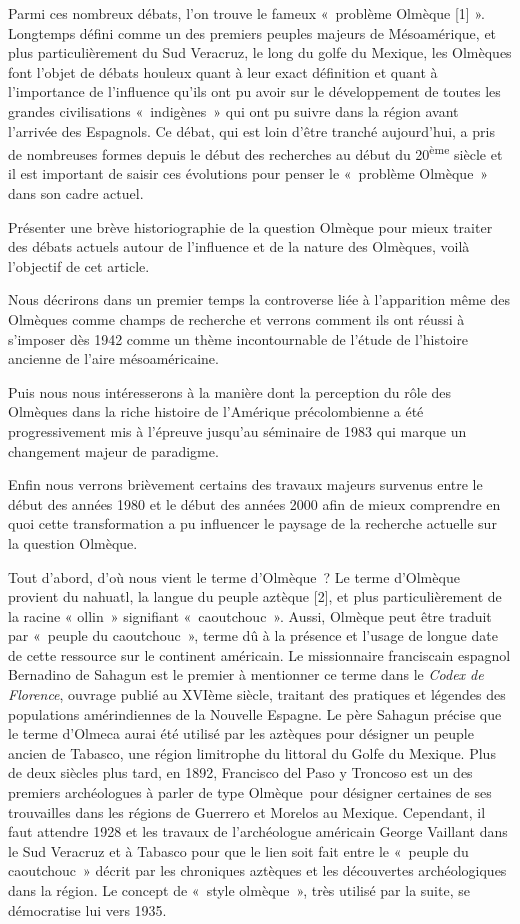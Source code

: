 \documentclass[11pt,a4paper]{article}
\begin{document}
Parmi ces nombreux débats, l'on trouve le fameux «~problème Olmèque {[}1{]} ». Longtemps défini comme un des premiers peuples majeurs de Mésoamérique, et plus particulièrement du Sud Veracruz, le long du golfe du Mexique, les Olmèques font l'objet de débats houleux quant à leur exact définition et quant à l'importance de l'influence qu'ils ont pu avoir sur le développement de toutes les grandes civilisations «~indigènes~» qui ont pu suivre dans la région avant l'arrivée des Espagnols. Ce débat, qui est loin d'être tranché aujourd'hui, a pris de nombreuses formes depuis le début des recherches au début du 20\textsuperscript{ème} siècle et il est important de saisir ces évolutions pour penser le «~problème Olmèque~» dans son cadre actuel.

Présenter une brève historiographie de la question Olmèque pour mieux traiter des débats actuels autour de l'influence et de la nature des Olmèques, voilà l'objectif de cet article.

Nous décrirons dans un premier temps la controverse liée à l'apparition même des Olmèques comme champs de recherche et verrons comment ils ont réussi à s'imposer dès 1942 comme un thème incontournable de l'étude de l'histoire ancienne de l'aire mésoaméricaine.

Puis nous nous intéresserons à la manière dont la perception du rôle des Olmèques dans la riche histoire de l'Amérique précolombienne a été progressivement mis à l'épreuve jusqu'au séminaire de 1983 qui marque un changement majeur de paradigme.

Enfin nous verrons brièvement certains des travaux majeurs survenus entre le début des années 1980 et le début des années 2000 afin de mieux comprendre en quoi cette transformation a pu influencer le paysage de la recherche actuelle sur la question Olmèque.

Tout d'abord, d'où nous vient le terme d'Olmèque~? Le terme d'Olmèque provient du nahuatl, la langue du peuple aztèque {[}2{]}, et plus particulièrement de la racine « ollin~» signifiant «~caoutchouc~». Aussi, Olmèque peut être traduit par «~peuple du caoutchouc~», terme dû à la présence et l'usage de longue date de cette ressource sur le continent américain. Le missionnaire franciscain espagnol Bernadino de Sahagun est le premier à mentionner ce terme dans le \emph{Codex de Florence}, ouvrage publié au XVIème siècle, traitant des pratiques et légendes des populations amérindiennes de la Nouvelle Espagne. Le père Sahagun précise que le terme d'Olmeca aurai été utilisé par les aztèques pour désigner un peuple ancien de Tabasco, une région limitrophe du littoral du Golfe du Mexique. Plus de deux siècles plus tard, en 1892, Francisco del Paso y Troncoso est un des premiers archéologues à parler de type Olmèque~pour désigner certaines de ses trouvailles dans les régions de Guerrero et Morelos au Mexique. Cependant, il faut attendre 1928 et les travaux de l'archéologue américain George Vaillant dans le Sud Veracruz et à Tabasco pour que le lien soit fait entre le «~peuple du caoutchouc~» décrit par les chroniques aztèques et les découvertes archéologiques dans la région. Le concept de «~style olmèque~», très utilisé par la suite, se démocratise lui vers 1935.
\end{document}
